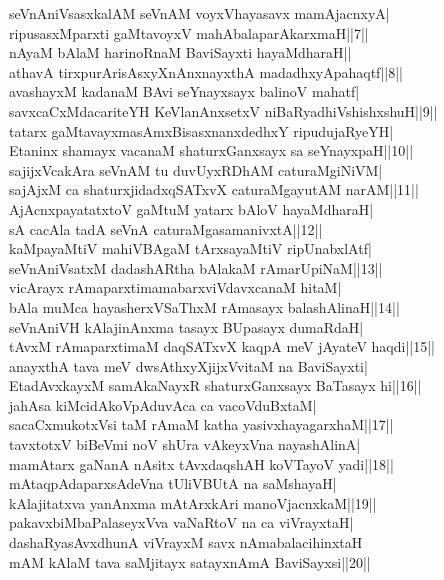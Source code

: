 \documentclass{article}
\begin{document}
seVnAniVsasxkalAM seVnAM voyxVhayasavx mamAjacnxyA|\\
ripusasxMparxti gaMtavoyxV mahAbalaparAkarxmaH||7||\\
nAyaM bAlaM harinoRnaM BaviSayxti hayaMdharaH||\\
athavA tirxpurArisAsxyXnAnxnayxthA madadhxyApahaqtf||8||\\
avashayxM kadanaM BAvi seYnayxsayx balinoV mahatf|\\
savxcaCxMdacariteYH KeVlanAnxsetxV niBaRyadhiVshishxshuH||9||\\
tatarx gaMtavayxmasAmxBisasxnanxdedhxY ripudujaRyeYH|\\
Etaninx shamayx vacanaM shaturxGanxsayx sa seYnayxpaH||10||\\
sajijxVcakAra seVnAM tu duvUyxRDhAM caturaMgiNiVM|\\
sajAjxM ca shaturxjidadxqSATxvX caturaMgayutAM narAM||11||\\
AjAcnxpayatatxtoV gaMtuM yatarx bAloV hayaMdharaH|\\
sA cacAla tadA seVnA caturaMgasamanivxtA||12||\\
kaMpayaMtiV mahiVBAgaM tArxsayaMtiV ripUnabxlAtf|\\
seVnAniVsatxM dadashARtha bAlakaM rAmarUpiNaM||13||\\
vicArayx rAmaparxtimamabarxviVdavxcanaM hitaM|\\
bAla muMca hayasherxVSaThxM rAmasayx balashAlinaH||14||\\
seVnAniVH kAlajinAnxma tasayx BUpasayx dumaRdaH|\\
tAvxM rAmaparxtimaM daqSATxvX kaqpA meV jAyateV haqdi||15||\\
anayxthA tava meV dwsAthxyXjijxVvitaM na BaviSayxti|\\
EtadAvxkayxM samAkaNayxR shaturxGanxsayx BaTasayx hi||16||\\
ja{hA}sa kiMcidAkoVpAduvAca ca vacoVduBxtaM|\\
sacaCxmukotxVsi taM rAmaM katha yasivxhayagarxhaM||17||\\
tavxtotxV biBeVmi noV shUra vAkeyxVna nayashAlinA|\\
mamAtarx gaNanA nAsitx tAvxdaqshAH koVTayoV yadi||18||\\
mAtaqpAdaparxsAdeVna tUliVBUtA na saMshayaH|\\
kAlajitatxva yanAnxma mAtArxkAri manoVjacnxkaM||19||\\
pakavxbiMbaPalaseyxVva vaNaRtoV na ca viVrayxtaH|\\
dashaRyasAvxdhunA viVrayxM  savx nAmabalacihinxtaH\\
mAM kAlaM tava saMjitayx satayxnAmA BaviSayxsi||20||\\
\end{document}
